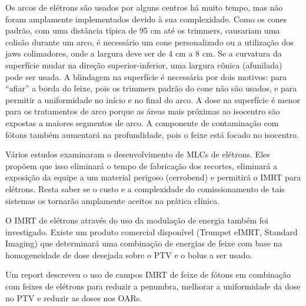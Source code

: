 \documentclass[11pt,a4paper]{article}
\begin{document}
	Os arcos de elétrons são usados por alguns centros há muito tempo, mas não foram amplamente implementados devido à sua complexidade. Como os cones padrão, com uma distância típica de 95 cm até os trimmers, causariam uma colisão durante um arco, é necessário um cone personalizado ou a utilização dos jaws colimadores, onde a largura deve ser de 4 cm a 8 cm. Se a curvatura da superfície mudar na direção superior-inferior, uma largura cônica (afunilada) pode ser usada. A blindagem na superfície é necessária por dois motivos: para ``afiar'' a borda do feixe, pois os trimmers padrão do cone não são usados, e para permitir a uniformidade no início e no final do arco. A dose na superfície é menor para os tratamentos de arco porque as áreas mais próximas ao isocentro são expostas a maiores segmentos de arco. A componente de contaminação com fótons também aumentará na profundidade, pois o feixe está focado no isocentro.  

	Vários estudos examinaram o desenvolvimento de MLCs de elétrons. Eles propõem que isso eliminará o tempo de fabricação dos recortes, eliminará a exposição da equipe a um material perigoso (cerrobend) e permitirá o IMRT para elétrons. Resta saber se o custo e a complexidade do comissionamento de tais sistemas os tornarão amplamente aceitos na prática clínica.

	O IMRT de elétrons através do uso da modulação de energia também foi investigado. Existe um produto comercial disponível (Trumpet eIMRT, Standard Imaging) que determinará uma combinação de energias de feixe com base na homogeneidade de dose desejada sobre o PTV e o bolus a ser usado. 
	
	Um report descreveu o uso de campos IMRT de feixe de fótons em combinação com feixes de elétrons para reduzir a penumbra, melhorar a uniformidade da dose no PTV e reduzir as doses nos OARs.


\end{document}
